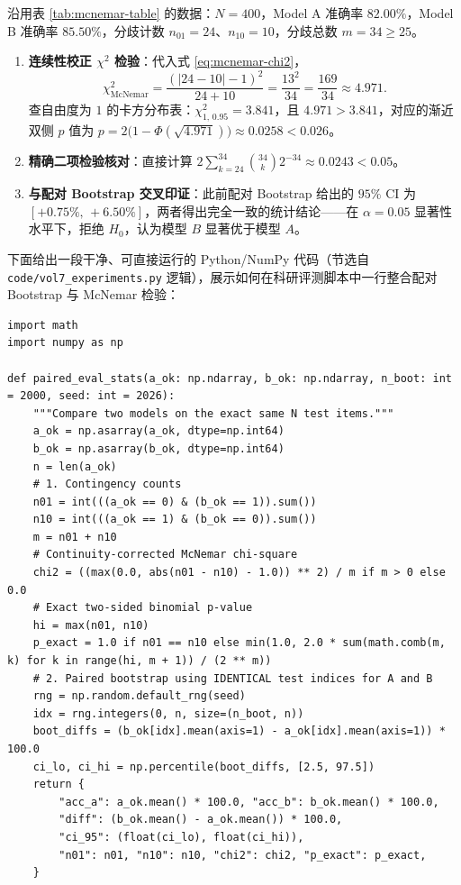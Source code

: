 \begin{example}\label{ex:mcnemar-calc}
沿用表 \ref{tab:mcnemar-table} 的数据：$N=400$，Model A 准确率 $82.00\%$，Model B 准确率 $85.50\%$，分歧计数 $n_{01} = 24$、$n_{10} = 10$，分歧总数 $m = 34 \ge 25$。
\begin{enumerate}
  \item \textbf{连续性校正 $\chi^2$ 检验}：代入式 \eqref{eq:mcnemar-chi2}，
  \[
    \chi^2_{\mathrm{McNemar}} = \frac{(|24 - 10| - 1)^2}{24 + 10} = \frac{13^2}{34} = \frac{169}{34} \approx 4.971.
  \]
  查自由度为 $1$ 的卡方分布表：$\chi^2_{1,\,0.95} = 3.841$，且 $4.971 > 3.841$，对应的渐近双侧 $p$ 值为 $p = 2\big(1-\Phi(\sqrt{4.971})\big) \approx 0.0258 < 0.026$。
  \item \textbf{精确二项检验核对}：直接计算 $2\sum_{k=24}^{34}\binom{34}{k}2^{-34} \approx 0.0243 < 0.05$。
  \item \textbf{与配对 Bootstrap 交叉印证}：此前配对 Bootstrap 给出的 $95\%$ CI 为 $[+0.75\%,\, +6.50\%]$，两者得出完全一致的统计结论——在 $\alpha = 0.05$ 显著性水平下，拒绝 $H_0$，认为模型 $B$ 显著优于模型 $A$。
\end{enumerate}
\end{example}

下面给出一段干净、可直接运行的 Python/NumPy 代码（节选自 \texttt{code/vol7\_experiments.py} 逻辑），展示如何在科研评测脚本中一行整合配对 Bootstrap 与 McNemar 检验：

\begin{lstlisting}[caption={配对 Bootstrap 置信区间与 McNemar 精确/卡方检验（Python/NumPy）}]
import math
import numpy as np

def paired_eval_stats(a_ok: np.ndarray, b_ok: np.ndarray, n_boot: int = 2000, seed: int = 2026):
    """Compare two models on the exact same N test items."""
    a_ok = np.asarray(a_ok, dtype=np.int64)
    b_ok = np.asarray(b_ok, dtype=np.int64)
    n = len(a_ok)
    # 1. Contingency counts
    n01 = int(((a_ok == 0) & (b_ok == 1)).sum())
    n10 = int(((a_ok == 1) & (b_ok == 0)).sum())
    m = n01 + n10
    # Continuity-corrected McNemar chi-square
    chi2 = ((max(0.0, abs(n01 - n10) - 1.0)) ** 2) / m if m > 0 else 0.0
    # Exact two-sided binomial p-value
    hi = max(n01, n10)
    p_exact = 1.0 if n01 == n10 else min(1.0, 2.0 * sum(math.comb(m, k) for k in range(hi, m + 1)) / (2 ** m))
    # 2. Paired bootstrap using IDENTICAL test indices for A and B
    rng = np.random.default_rng(seed)
    idx = rng.integers(0, n, size=(n_boot, n))
    boot_diffs = (b_ok[idx].mean(axis=1) - a_ok[idx].mean(axis=1)) * 100.0
    ci_lo, ci_hi = np.percentile(boot_diffs, [2.5, 97.5])
    return {
        "acc_a": a_ok.mean() * 100.0, "acc_b": b_ok.mean() * 100.0,
        "diff": (b_ok.mean() - a_ok.mean()) * 100.0,
        "ci_95": (float(ci_lo), float(ci_hi)),
        "n01": n01, "n10": n10, "chi2": chi2, "p_exact": p_exact,
    }
\end{lstlisting}

